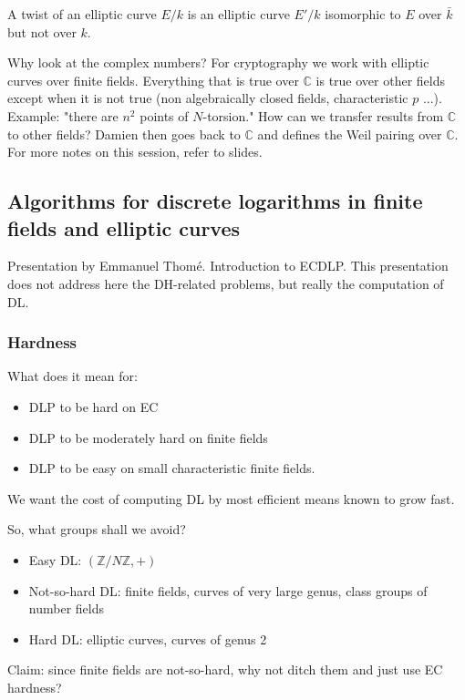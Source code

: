\documentclass[11pt]{article}
\begin{document}
A twist of an elliptic curve $E/k$ is an elliptic curve $E'/k$ isomorphic to $E$ over $\bar{k}$ but not over $k$.

Why look at the complex numbers? For cryptography we work with elliptic curves over finite fields. Everything that is true over $\mathbb{C}$ is true over other fields except when it is not true (non algebraically closed fields, characteristic $p$ ...). Example: "there are $n^2$ points of $N$-torsion."
How can we transfer results from $\mathbb{C}$ to other fields?
Damien then goes back to $\mathbb{C}$ and defines the Weil pairing over $\mathbb{C}$.
For more notes on this session, refer to slides.

\subsection{Algorithms for discrete logarithms in finite fields and elliptic curves}
Presentation by Emmanuel Thomé. Introduction to ECDLP. This presentation does not address here the DH-related problems, but really the computation of DL.
\subsubsection{Hardness}
What does it mean for:
\begin{itemize}
	\item DLP to be hard on EC
	\item DLP to be moderately hard on finite fields
	\item DLP to be easy on small characteristic finite fields.
\end{itemize}

We want the cost of computing DL by most efficient
means known to grow fast.

So, what groups shall we avoid?
\begin{itemize}
	\item Easy DL: $(\mathbb{Z}/N\mathbb{Z}, +)$
	\item Not-so-hard DL: finite fields, curves of very large genus, class
groups of number fields
	\item Hard DL: elliptic curves, curves of genus 2
\end{itemize}

Claim: since finite fields are not-so-hard, why not ditch them and just use EC hardness?
\end{document}

